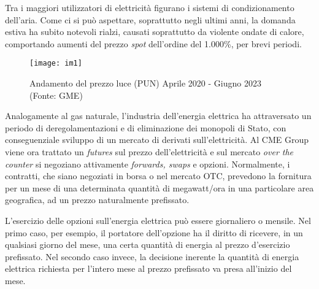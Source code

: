 \documentclass[12pt,a4paper]{report}
\begin{document}
Tra i maggiori utilizzatori di elettricità figurano i sistemi di condizionamento dell'aria. Come ci si può aspettare, soprattutto negli ultimi anni, la domanda estiva ha subito notevoli rialzi, causati soprattutto da violente ondate di calore, comportando aumenti del prezzo \textit{spot} dell'ordine del 1.000\%, per brevi periodi.

\begin{figure}
    \centering
\texttt{[image: im1]}
\caption{Andamento del prezzo luce (PUN) Aprile 2020 - Giugno 2023 (Fonte: GME)}
    \label{fig:enter-labelgas}
\end{figure}

Analogamente al gas naturale, l'industria dell'energia elettrica ha attraversato un periodo di deregolamentazioni e di eliminazione dei monopoli di Stato, con conseguenziale sviluppo di un mercato di derivati sull'elettricità. Al CME Group viene ora trattato un \textit{futures} sul prezzo dell'elettricità e sul mercato \textit{over the counter} si negoziano attivamente \textit{forwards, swaps} e opzioni. Normalmente, i contratti, che siano negoziati in borsa o nel mercato OTC, prevedono la fornitura per un mese di una determinata quantità di megawatt/ora in una particolare area geografica, ad un prezzo naturalmente prefissato.

L'esercizio delle opzioni sull'energia elettrica può essere giornaliero o mensile. Nel primo caso, per esempio, il portatore dell'opzione ha il diritto di ricevere, in un qualsiasi giorno del mese, una certa quantità di energia al prezzo d'esercizio prefissato. Nel secondo caso invece, la decisione inerente la quantità di energia elettrica richiesta per l'intero mese al prezzo prefissato va presa all'inizio del mese.
\end{document}
